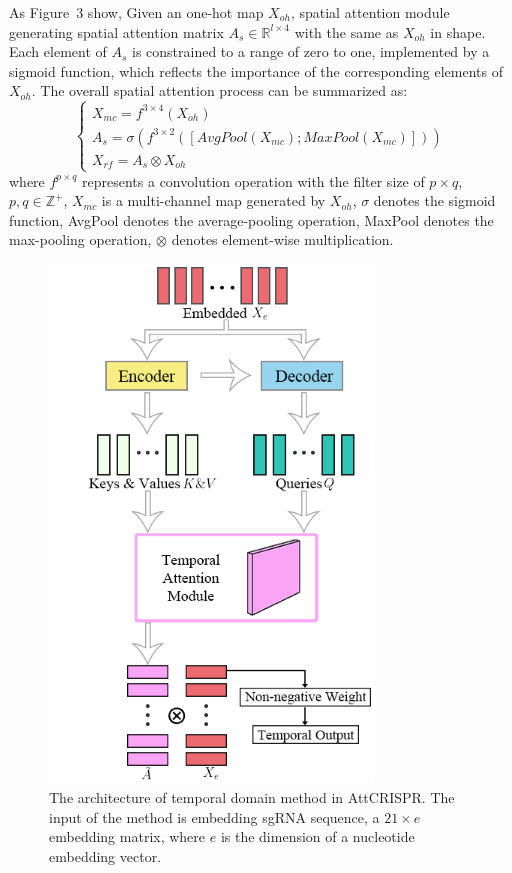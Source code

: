 \documentclass{bioinfo}
\begin{document}
As Figure~3\vphantom{\ref{fig:03}} show, Given an one-hot map $X_{oh}$, spatial attention module generating spatial attention matrix 
$A_s\in\mathbb{R}^{l\times 4}$ with the same as $X_{oh}$ in shape. 
Each element of $A_s$ is constrained to a range of zero to one, implemented by a sigmoid function, which reflects the importance of the corresponding elements of $X_{oh}$.
The overall spatial attention process can be summarized as:
\begin{equation}
\left\{\begin{matrix}
X_{mc} = f^{3\times4}(X_{oh})
\\A_s = \sigma(f^{3\times2}([AvgPool(X_{mc});MaxPool(X_{mc})]))
\\X_{rf} = A_s\otimes X_{oh}
\end{matrix}\right.\label{eq:11}
\end{equation}
where $f^{p\times q}$ represents a convolution operation with the filter size of $p\times q$, 
$p,q\in\mathbb{Z}^{+}$, $X_{mc}$ is a multi-channel map generated by $X_{oh}$, $\sigma$ denotes the sigmoid function, 
AvgPool denotes the average-pooling operation, MaxPool denotes the max-pooling operation, $\otimes$ denotes element-wise multiplication.
\begin{figure}[!tpb]%
    \centerline{\includegraphics[width=86mm]{temporalmodule.png}}
    \caption{The architecture of temporal domain method in AttCRISPR. 
    The input of the method is embedding sgRNA sequence, a $21\times e$ embedding matrix, where $e$ is the dimension of a nucleotide embedding vector. 
    }\label{fig:04}
\end{figure}
\end{document}

